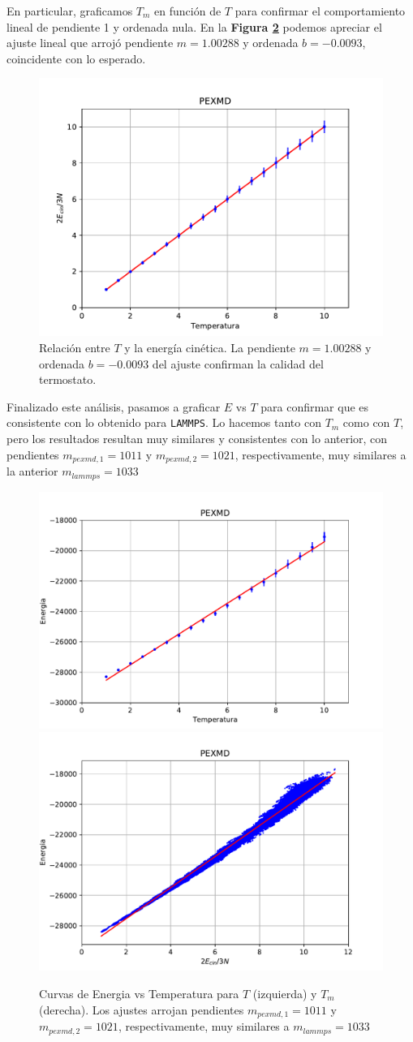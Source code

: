 \documentclass[twoside, 12pt]{article}
\begin{document}
En particular, graficamos $T_m$ en función de $T$ para confirmar el comportamiento lineal de pendiente 1 y ordenada nula. 
En la \textbf{Figura \ref{fig:EcinvsT}} podemos apreciar el ajuste lineal que arrojó pendiente $m=1.00288$ y ordenada $b=-0.0093$, coincidente con lo esperado.

\begin{figure}[H]
	\centering
	\includegraphics[width=0.5\columnwidth]{ecinvt_pexmd.pdf}
	\caption{Relación entre $T$ y la energía cinética. La pendiente $m=1.00288$ y ordenada $b=-0.0093$ del ajuste confirman la calidad del termostato.}
	\label{fig:EcinvsT}
\end{figure}

Finalizado este análisis, pasamos a graficar $E$ vs $T$ para confirmar que es consistente con lo obtenido para \texttt{LAMMPS}. 
Lo hacemos tanto con $T_m$ como con $T$, pero los resultados resultan muy similares y consistentes con lo anterior, con pendientes $m_{pexmd,1}=1011$ y $m_{pexmd,2}=1021$, respectivamente, muy similares 
a la anterior $m_{lammps}=1033$

\begin{figure}[H]
	\centering
	\includegraphics[width=0.48\columnwidth]{evt_pexmd.pdf}
	\includegraphics[width=0.48\columnwidth]{evecin_pexmd.pdf}
	\caption{Curvas de Energia vs Temperatura para $T$ (izquierda) y $T_m$ (derecha). Los ajustes arrojan pendientes $m_{pexmd,1}=1011$ y $m_{pexmd,2}=1021$, respectivamente, muy similares 
	a $m_{lammps}=1033$}
	\label{fig:EcinvsT}
\end{figure}
\end{document}
